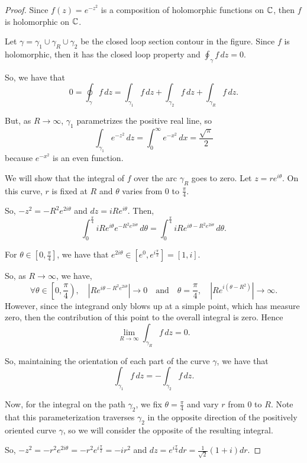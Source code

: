 \documentclass[../hw2]{subfiles}
\begin{document}
\begin{proof}
	Since $f(z)=e^{-z^2}$ is a composition of holomorphic functions on $\mathbb{C}$, then $f$ is holomorphic on $\mathbb{C}$.

	Let  $\gamma = \gamma_1 \cup \gamma_R \cup \gamma_2$ be the closed loop section contour in the figure.
	Since $f$ is holomorphic, then it has the closed loop property and $\oint_{\gamma}f\,dz=0$.

	So, we have that \[
		0 = \oint_{\gamma} f\,dz = \int_{\gamma_1} f\,dz + \int_{\gamma_2}f\,dz +  \int_{\gamma_R} f\,dz
		.\]

	But, as $R\to \infty$, $\gamma_1$ parametrizes the positive real line, so \[
		\int_{\gamma_1} e^{-z^2} \,dz = \int_{0}^{\infty} e^{-x^2} \,dx = \frac{\sqrt{\pi} }{2}
	\] because $e^{-x^2}$ is an even function.

	We will show that the integral of $f$ over the arc $\gamma_R$ goes to zero.
	Let $z=re^{i\theta}$.
	On this curve, $r$ is fixed at $R$ and $\theta$ varies from $0$ to  $\frac{\pi}{4}$.

	So, $-z^2 = -R^2e^{2i\theta}$ and $dz=iRe^{i\theta}$.
	Then, \[
		\int_{0}^{\frac{\pi}{4}} iRe^{i\theta} e^{-R^2e^{2i\theta}} \,d\theta
		= \int_{0}^{\frac{\pi}{4}} iRe^{i\theta-R^2e^{2i\theta}} \,d\theta
		.\]

	For $\theta\in \left[0,\frac{\pi}{4}\right]$,
	we have that $e^{2i\theta}\in \left[ e^0, e^{i \frac{\pi}{2}} \right] = [1,i] $.

	So, as $R\to \infty$, we have, \[
		\forall \theta \in \left[ 0, \frac{\pi}{4} \right),\quad\left| Re^{i\theta-R^2e^{2i\theta}} \right| \to 0
		\quad \text{and} \quad
		\theta = \frac{\pi}{4}, \quad \left| Re^{i(\theta-R^2)} \right| \to \infty
		.\]
	However, since the integrand only blows up at a simple point, which has measure zero, then the contribution of this point to the overall integral is zero.
	Hence \[
		\lim_{R \to \infty} \int_{\gamma_R} f \,dz = 0
		.\]

So, maintaining the orientation of each part of the curve $\gamma$, we have that \[
\int_{\gamma_1} f\,dz = -\int_{\gamma_2} f\,dz  
.\] 

	Now, for the integral on the path $\gamma_2$, we fix $\theta=\frac{\pi}{4}$ and vary $r$ from  $0$ to  $R$. 
  Note that this parameterization traverses $\gamma_2$ in the opposite direction of the positively oriented curve $\gamma$, so we will consider the opposite of the resulting integral.

  So, $-z^2=-r^2e^{2i\theta}=-r^2e^{i \frac{\pi}{2}} = -ir^2$ and $dz = e^{i \frac{\pi}{4}}dr = \frac{1}{\sqrt{2} }(1+i) dr$. 


\end{proof}
\end{document}
